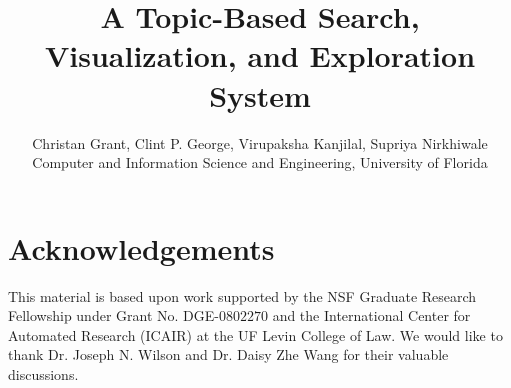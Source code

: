 \documentclass[letterpaper]{article}
\begin{document}
\title{A Topic-Based Search, Visualization, and Exploration System}
\author{Christan Grant, Clint P. George, Virupaksha Kanjilal, Supriya Nirkhiwale\\
Computer and Information Science and Engineering, University of Florida}

\maketitle










\section{Acknowledgements}

This material is based upon work supported by the NSF Graduate 
Research Fellowship under Grant No. 
DGE-$0802270$ and the International Center for Automated 
Research (ICAIR) at the UF Levin College of Law. 
We would like to thank Dr. Joseph N. Wilson and Dr. Daisy Zhe Wang 
for their valuable discussions. 




\end{document}
